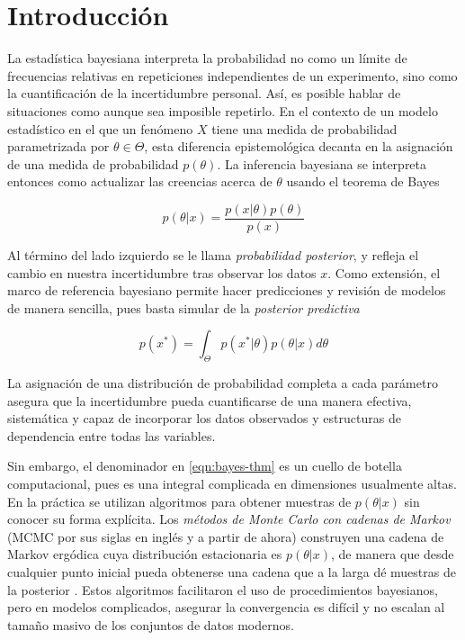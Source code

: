 \documentclass[main.tex]{subfiles}
\begin{document}
\chapter{Introducción}
La estadística bayesiana interpreta la probabilidad no como un límite de frecuencias relativas en repeticiones independientes de un experimento, sino como la cuantificación de la incertidumbre personal. Así, es posible hablar de situaciones como  aunque sea imposible repetirlo. En el contexto de un modelo estadístico en el que un fenómeno $X$ tiene una medida de probabilidad parametrizada por $\theta \in \Theta$, esta diferencia epistemológica decanta en la asignación de una medida de probabilidad $p(\theta)$. La inferencia bayesiana se interpreta entonces como actualizar las creencias acerca de $\theta$ usando el teorema de Bayes

\begin{equation}
	p(\theta | x) = \frac{p(x|\theta)p(\theta)}{p(x)}
	\label{eqn:bayes-thm}	
\end{equation}

Al término del lado izquierdo se le llama \textit{probabilidad posterior}, y refleja el cambio en nuestra incertidumbre tras observar los datos $x$. Como extensión, el marco de referencia bayesiano permite hacer predicciones y revisión de modelos de manera sencilla, pues basta simular de la \textit{posterior predictiva} 

\begin{equation*}
	p(x^*) = \int_\Theta p(x^*|\theta)p(\theta | x) d\theta	
\end{equation*}

La asignación de una distribución de probabilidad completa a cada parámetro asegura que la incertidumbre pueda cuantificarse de una manera efectiva, sistemática y capaz de incorporar los datos observados y estructuras de dependencia entre todas las variables.

Sin embargo, el denominador en \eqref{eqn:bayes-thm} es un cuello de botella computacional, pues es una integral complicada en dimensiones usualmente altas. En la práctica se utilizan algoritmos para obtener muestras de $p(\theta |x)$ sin conocer su forma explícita. Los \textit{métodos de Monte Carlo con cadenas de Markov} (MCMC por sus siglas en inglés y a partir de ahora) construyen una cadena de Markov ergódica cuya distribución estacionaria es $p(\theta | x)$, de manera que desde cualquier punto inicial pueda obtenerse una cadena que a la larga dé muestras de la posterior \cite{robert-book}. Estos algoritmos facilitaron el uso de procedimientos bayesianos, pero en modelos complicados, asegurar la convergencia es difícil y no escalan al tamaño masivo de los conjuntos de datos modernos.
\end{document}
